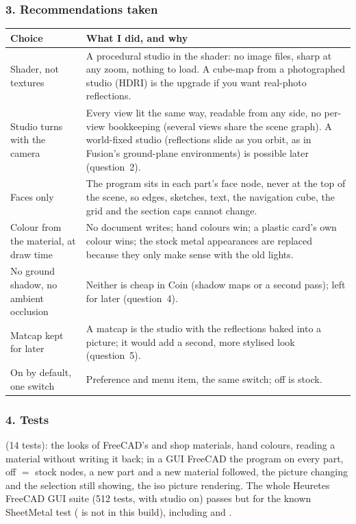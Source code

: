 \subsubsection*{3. Recommendations taken}
\begin{center}
\small
\begin{tabularx}{\linewidth}{@{}p{4.2cm}X@{}}
\toprule
Choice & What I did, and why\\
\midrule
Shader, not textures & A procedural studio in the shader: no image files, sharp at any zoom, nothing to load. A
  cube-map from a photographed studio (HDRI) is the upgrade if you want real-photo reflections.\\
Studio turns with the camera & Every view lit the same way, readable from any side, no per-view bookkeeping (several
  views share the scene graph). A world-fixed studio (reflections slide as you orbit, as in Fusion's ground-plane
  environments) is possible later (question~2).\\
Faces only & The program sits in each part's face node, never at the top of the scene, so edges, sketches, text,
  the navigation cube, the grid and the section caps cannot change.\\
Colour from the material, at draw time & No document writes; hand colours win; a plastic card's own colour wins; the
  stock metal appearances are replaced because they only make sense with the old lights.\\
No ground shadow, no ambient occlusion & Neither is cheap in Coin (shadow maps or a second pass); left for later
  (question~4).\\
Matcap kept for later & A matcap is the studio with the reflections baked into a picture; it would add a second,
  more stylised look (question~5).\\
On by default, one switch & Preference and menu item, the same switch; off is stock.\\
\bottomrule
\end{tabularx}
\end{center}

\subsubsection*{4. Tests}
 (14 tests): the looks of FreeCAD's and shop materials, hand colours, reading a
material without writing it back; in a GUI FreeCAD the program on every part, off $=$ stock nodes, a new part and a
new material followed, the picture changing and the selection still showing, the iso picture rendering. The whole
Heuretes FreeCAD GUI suite (512 tests, with studio on) passes but for the known SheetMetal test ( is
not in this build), including  and .

